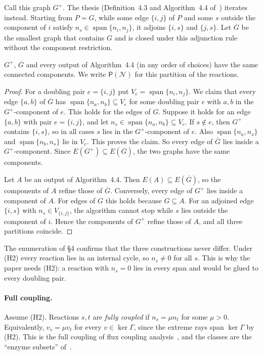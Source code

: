 \documentclass[11pt,a4paper]{report}
\newcommand{\Net}{\mathcal{N}}
\newcommand{\spn}{\operatorname{span}}
\newcommand{\Pre}{\mathsf{P}}
\begin{document}
Call this graph \(G^+\). The thesis (Definition~4.3 and Algorithm~4.4 of~\autocite{Iosif2019}) iterates instead.
Starting from \(P=G\), while some edge \(\{i,j\}\) of \(P\) and some \(s\) outside the component of \(i\) satisfy
\(n_s\in\spn\{n_i,n_j\}\), it adjoins \(\{i,s\}\) and \(\{j,s\}\). Let \(\overline G\) be the smallest graph that
contains \(G\) and is closed under this adjunction rule without the component restriction.

\begin{lemma}\label{lem:variants}
\(G^+\), \(\overline G\) and every output of Algorithm~4.4 (in any order of choices) have the same connected
components. We write \(\Pre(\Net)\) for this partition of the reactions.
\end{lemma}
\begin{proof}
For a doubling pair \(e=\{i,j\}\) put \(V_e=\spn\{n_i,n_j\}\). We claim that every edge \(\{a,b\}\) of
\(\overline G\) has \(\spn\{n_a,n_b\}\subseteq V_e\) for some doubling pair \(e\) with \(a,b\) in the
\(G^+\)-component of \(e\). This holds for the edges of \(G\). Suppose it holds for an edge \(\{a,b\}\) with pair
\(e=\{i,j\}\), and let \(n_s\in\spn\{n_a,n_b\}\subseteq V_e\). If \(s\notin e\), then \(G^+\) contains \(\{i,s\}\),
so in all cases \(s\) lies in the \(G^+\)-component of \(e\). Also \(\spn\{n_a,n_s\}\) and \(\spn\{n_b,n_s\}\) lie in \(V_e\). This proves the claim.
So every edge of \(\overline G\) lies inside a \(G^+\)-component. Since \(E(G^+)\subseteq E(\overline G)\), the two
graphs have the same components.

Let \(A\) be an output of Algorithm~4.4. Then \(E(A)\subseteq E(\overline G)\), so the components of \(A\) refine those
of \(\overline G\). Conversely, every edge of \(G^+\) lies inside a component of \(A\). For edges of \(G\) this holds
because \(G\subseteq A\). For an adjoined edge \(\{i,s\}\) with \(n_s\in V_{\{i,j\}}\), the algorithm cannot stop
while \(s\) lies outside the component of \(i\). Hence the components of \(G^+\) refine those of \(A\), and all three
partitions coincide.
\end{proof}

The enumeration of §4 confirms that the three constructions never differ. Under (H2) every reaction lies in an
internal cycle, so \(n_s\neq0\) for all \(s\). This is why the paper needs (H2): a reaction with \(n_s=0\) lies in every
span and would be glued to every doubling pair.

\paragraph{Full coupling.} Assume (H2). Reactions \(s,t\) are \emph{fully coupled} if \(n_s=\mu n_t\) for some
\(\mu>0\). Equivalently, \(v_s=\mu v_t\) for every \(v\in\ker\Gamma\), since the extreme rays span \(\ker\Gamma\) by
(H2). This is the full coupling of flux coupling analysis~\autocite{Burgard2004}, and the classes are the ``enzyme
subsets'' of~\autocite{Pfeiffer1999}.
\end{document}
